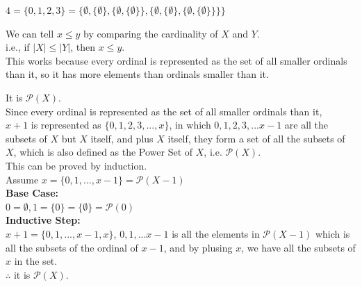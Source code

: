 \documentclass[12pt]{exam}
\begin{document}
\begin{solution}
    \begin{qparts}
        \item 
        $4 = \{ 0,1,2,3\} = \{\emptyset, \{ \emptyset \}, \{ \emptyset, \{ \emptyset \} \}, \{ \emptyset, \{ \emptyset \}, \{ \emptyset, \{ \emptyset \} \} \}\}$
        \item 
        We can tell $x \leq y$ by comparing the cardinality of $X$ and $Y$.\\
        i.e., if $|X| \leq |Y|$, then $x \leq y$.\\
        This works because every ordinal is represented as the set of all smaller ordinals than it, so it has more elements than ordinals smaller than it.
        \item 
        It is $\mathcal{P}(X)$.\\
        Since every ordinal is represented as the set of all smaller ordinals than it,\\
         $x+1$ is represented as $\{0,1,2,3,...,x\}$, in which $0,1,2,3,...x-1$ are all the subsets of $X$ but $X$ itself, 
         and plus $X$ itself, they form a set of all the subsets of $X$, which is also defined as the Power Set of $X$, i.e. $\mathcal{P}(X)$.\\
         This can be proved by induction.\\
         Assume $x = \{0,1,...,x-1\} = \mathcal{P}(X-1)$\\
         \textbf{Base Case:}\\
        $0 = \emptyset, 1 = \{0\} = \{\emptyset\} = \mathcal{P}({0})$\\ 
        \textbf{Inductive Step:}\\
        $x+1 = \{0,1,...,x-1,x\}$, $0,1,...x-1$ is all the elements in $\mathcal{P}(X-1)$ which is all the subsets of the ordinal of $x-1$, and by plusing $x$, we have all the subsets of $x$ in the set.
        \\$\therefore$ it is $\mathcal{P}(X)$.

    \end{qparts}
\end{solution}
\end{document}
